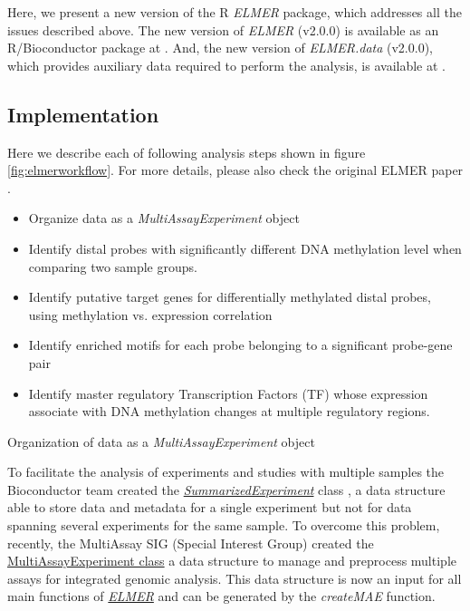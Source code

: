 Here, we present a new version of the R \textit{ELMER} package, which addresses all the issues described above. 
The new version of \textit{ELMER} (v2.0.0) is available as an R/Bioconductor package at . And, the new version of \textit{ELMER.data} (v2.0.0), which provides auxiliary data required to perform the analysis, is available at 
. 

\subsection*{Implementation}

Here we describe each of following analysis steps shown in figure \ref{fig:elmerworkflow}. For more details, please also check the original ELMER paper \cite{yao2015inferring}. 
\begin{itemize}
    \item Organize data as a \textit{MultiAssayExperiment} object
	\item Identify distal probes with significantly different DNA methylation level when comparing two sample groups.
	\item Identify putative target genes for differentially methylated distal probes, using methylation vs. expression correlation
	\item Identify enriched motifs for each probe belonging to a significant probe-gene pair
	\item Identify master regulatory Transcription Factors (TF) whose expression associate with DNA methylation changes at multiple regulatory regions.
\end{itemize}

Organization of data as a \textit{MultiAssayExperiment} object

To facilitate the analysis of experiments and studies with multiple samples the Bioconductor team created the \href{http://bioconductor.org/packages/SummarizedExperiment/}{\textit{SummarizedExperiment}} class \cite{huber2015orchestrating}, a data structure able to store data and metadata for a single experiment but not for data spanning several experiments for the same sample. To overcome this problem, recently, the MultiAssay SIG (Special Interest Group) created the \href{http://bioconductor.org/packages/MultiAssayExperiment/}{MultiAssayExperiment class} \cite{mae2017} a data structure to manage and preprocess multiple assays for integrated genomic analysis. This data structure is now an input for all main functions of \href{https://github.com/tiagochst/ELMER}{\textit{ELMER}} and can be generated by the \textit{createMAE} function. 



